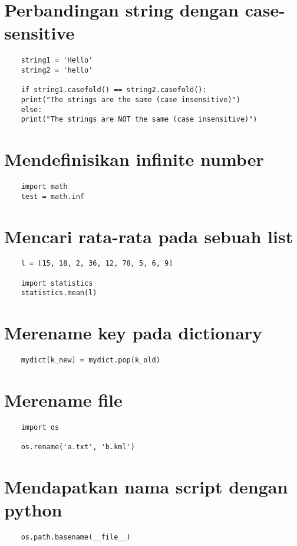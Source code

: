 \documentclass{article}
\begin{document}
\section {Perbandingan string dengan case-sensitive}
\begin{lstlisting}
	string1 = 'Hello'
	string2 = 'hello'
	
	if string1.casefold() == string2.casefold():
	print("The strings are the same (case insensitive)")
	else:
	print("The strings are NOT the same (case insensitive)")
\end{lstlisting}

\section {Mendefinisikan infinite number}
\begin{lstlisting}
	import math
	test = math.inf
\end{lstlisting}

\section {Mencari rata-rata pada sebuah list}
\begin{lstlisting}
	l = [15, 18, 2, 36, 12, 78, 5, 6, 9]
	
	import statistics
	statistics.mean(l)
\end{lstlisting}

\section {Merename key pada dictionary}
\begin{lstlisting}
	mydict[k_new] = mydict.pop(k_old)
\end{lstlisting}

\section {Merename file}
\begin{lstlisting}
	import os
	
	os.rename('a.txt', 'b.kml')
\end{lstlisting}

\section {Mendapatkan nama script dengan python}
\begin{lstlisting}
	os.path.basename(__file__)
\end{lstlisting}
\end{document}

